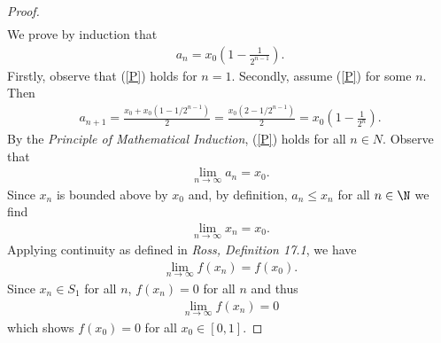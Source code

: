 \documentclass{article}
\begin{document}
\begin{proof}
\begin{align*}
	\end{align*}
	We prove by induction that
	\begin{align}
		\label{P}
		a_n = x_0 \left(1-\frac{1}{2^{n-1}}\right).
	\end{align}
	Firstly, observe that (\ref{P}) holds for $n=1$. Secondly, assume (\ref{P}) for
	some $n$. Then
	\begin{align*}
		a_{n+1} = \frac{x_0 + x_0(1-1/2^{n-1})}{2}
		= \frac{x_0(2-1/2^{n-1})}{2} = x_0\left(1-\frac{1}{2^n}\right).
	\end{align*}
	By the \emph{Principle of Mathematical Induction}, (\ref{P}) holds for all $n\in N$.
	Observe that
	\begin{align*}
		\lim_{n\to\infty}a_n = x_0.
	\end{align*}
	Since $x_n$ is bounded above by $x_0$ and, by definition, $a_n\leq x_n$ for all $n\in\N$
	we find
	\begin{align*}
		\lim_{n\to\infty}x_n = x_0.
	\end{align*}
	Applying continuity as defined in \emph{Ross, Definition 17.1}, we have
	\begin{align*}
		\lim_{n\to\infty} f(x_n) = f(x_0).
	\end{align*}
	Since $x_n\in S_1$ for all $n$, $f(x_n)=0$ for all $n$ and thus
	\begin{align*}
		\lim_{n\to\infty} f(x_n) = 0
	\end{align*}
	which shows $f(x_0)=0$ for all $x_0\in[0,1]$.
\end{proof}
\end{document}
